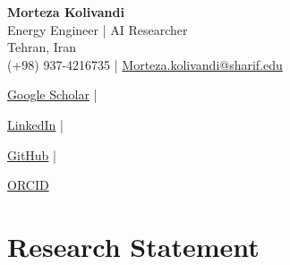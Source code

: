 \documentclass[letter,20pt]{article}
\begin{document}

\begin{center}

{\LARGE \textbf{Morteza Kolivandi}}\\[5pt]

Energy Engineer | AI Researcher\\

Tehran, Iran\\

(+98) 937-4216735
\quad | \quad
\href{mailto:Morteza.kolivandi@sharif.edu}
{Morteza.kolivandi@sharif.edu}

\vspace{5pt}

\href{https://scholar.google.com/citations?user=FICYUZIAAAAJ}
{Google Scholar}
\quad | \quad

\href{https://www.linkedin.com/in/morteza-kolivandi-a50b94207/}
{LinkedIn}
\quad | \quad

\href{https://github.com/Mortezano1}
{GitHub}
\quad | \quad

\href{https://orcid.org/0000-0003-2370-111X}
{ORCID}

\end{center}




\section{\textbf{Research Statement}}

\vspace{5pt}
\end{document}
